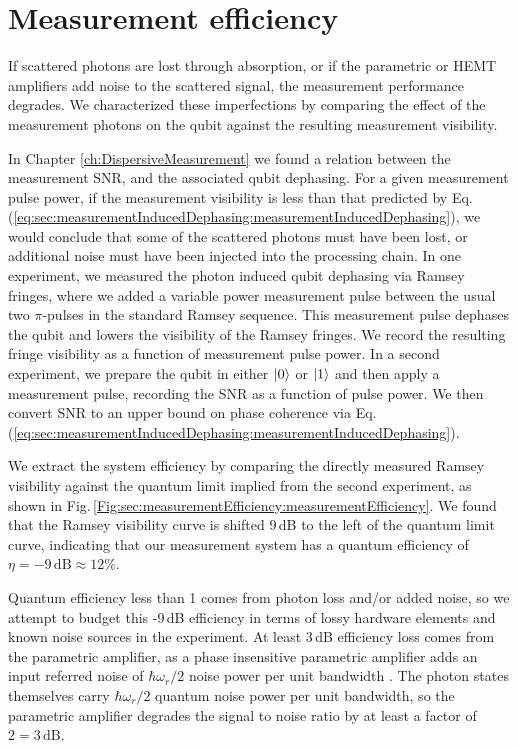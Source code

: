\section{Measurement efficiency}

If scattered photons are lost through absorption, or if the parametric or HEMT amplifiers add noise to the scattered signal, the measurement performance degrades.
We characterized these imperfections by comparing the effect of the measurement photons on the qubit against the resulting measurement visibility.

In Chapter \ref{ch:DispersiveMeasurement} we found a relation between the measurement SNR, and the associated qubit dephasing.
For a given measurement pulse power, if the measurement visibility is less than that predicted by Eq.\,(\ref{eq:sec:measurementInducedDephasing:measurementInducedDephasing}), we would conclude that some of the scattered photons must have been lost, or additional noise must have been injected into the processing chain.
In one experiment, we measured the photon induced qubit dephasing via Ramsey fringes, where we added a variable power measurement pulse between the usual two $\pi$-pulses in the standard Ramsey sequence.
This measurement pulse dephases the qubit and lowers the visibility of the Ramsey fringes.
We record the resulting fringe visibility as a function of measurement pulse power.
In a second experiment, we prepare the qubit in either $|0\rangle$ or $|1\rangle$ and then apply a measurement pulse, recording the SNR as a function of pulse power.
We then convert SNR to an upper bound on phase coherence via Eq.\,(\ref{eq:sec:measurementInducedDephasing:measurementInducedDephasing}).

We extract the system efficiency by comparing the directly measured Ramsey visibility against the quantum limit implied from the second experiment, as shown in Fig.\,\ref{Fig:sec:measurementEfficiency:measurementEfficiency}.
We found that the Ramsey visibility curve is shifted 9\,dB to the left of the quantum limit curve, indicating that our measurement system has a quantum efficiency of $\eta=-9\,\text{dB} \approx 12\%$.

Quantum efficiency less than 1 comes from photon loss and/or added noise, so we attempt to budget this -9\,dB efficiency in terms of lossy hardware elements and known noise sources in the experiment.
At least 3\,dB efficiency loss comes from the parametric amplifier, as a phase insensitive parametric amplifier adds an input referred noise of $\hbar \omega_r/2$ noise power per unit bandwidth \cite{Caves:amplifiers1982}.
The photon states themselves carry $\hbar \omega_r / 2$ quantum noise power per unit bandwidth, so the parametric amplifier degrades the signal to noise ratio by at least a factor of $2 = 3\,\text{dB}$.

